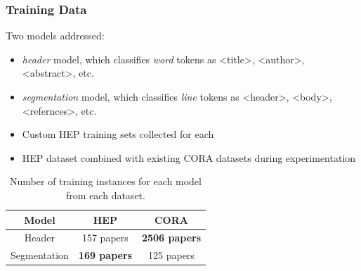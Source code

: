 \documentclass{beamer}
\begin{document}

\begin{frame}
\frametitle{Training Data}

Two models addressed:
\begin{itemize}
\item \emph{header} model, which classifies \emph{word} tokens as <title>, <author>, <abstract>, etc.
\item \emph{segmentation} model, which classifies \emph{line} tokens as <header>, <body>, <refernces>, etc.
\item Custom HEP training sets collected for each
\item HEP dataset combined with existing CORA datasets during experimentation

\end{itemize}

\begin{table}[h]
\begin{center}
\begin{tabular}{|c|c|c|}
\hline
Model & HEP & CORA \\
\hline
\hline
Header & 157 papers & \textbf{2506 papers} \\
\hline
Segmentation & \textbf{169 papers} & 125 papers \\
\hline
\end{tabular}
\caption[Number of training instances for each model from each dataset.]{Number of training instances for each model from each dataset.}
\end{center}
\end{table}
\end{frame}

\end{document}
